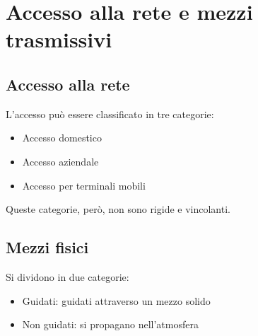 \documentclass[11pt,a4paper]{book}
\begin{document}
\section{Accesso alla rete e mezzi trasmissivi}
\subsection{Accesso alla rete}
L’accesso può essere classificato in tre categorie:
\begin{itemize}
	\item Accesso domestico
	\item Accesso aziendale
	\item Accesso per terminali mobili
\end{itemize}
Queste categorie, però, non sono rigide e vincolanti.

\subsection{Mezzi fisici}
Si dividono in due categorie:
\begin{itemize}
	\item Guidati: guidati attraverso un mezzo solido
	\item Non guidati: si propagano nell’atmosfera
\end{itemize}
\end{document}
